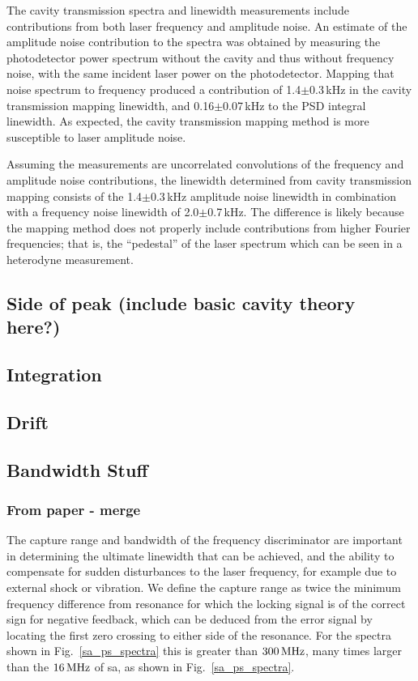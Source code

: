The cavity transmission spectra and linewidth measurements include contributions from both laser frequency and amplitude noise.
An estimate of the amplitude noise contribution to the spectra was obtained by measuring the photodetector power spectrum without the cavity and thus without frequency noise, with the same incident laser power on the photodetector.
Mapping that noise spectrum to frequency produced a contribution of 1.4$\pm$0.3\,kHz in the cavity transmission mapping linewidth,  and 0.16$\pm$0.07\,kHz to the PSD integral linewidth.
As expected, the cavity transmission mapping method is more susceptible to laser amplitude noise. 

Assuming the measurements are uncorrelated convolutions of the frequency and amplitude noise contributions, the linewidth determined from cavity transmission mapping consists of the 1.4$\pm$0.3\,kHz amplitude noise linewidth in combination with a frequency noise linewidth of 2.0$\pm$0.7\,kHz.
The difference is likely because the mapping method does not properly include contributions from higher Fourier frequencies; that is, the ``pedestal'' of the laser spectrum which can be seen in a heterodyne measurement.

\subsection{Side of peak (include basic cavity theory here?)}
\subsection{Integration}
\subsection{Drift}
\subsection{Bandwidth Stuff}
\subsubsection{From paper - merge}
\label{bandwidth_section}
The capture range and bandwidth of the frequency discriminator are important in determining the ultimate linewidth that can be achieved, and the ability to compensate for sudden disturbances to the laser frequency, for example due to external shock or vibration.
We define the capture range as twice the minimum frequency difference from resonance for which the locking signal is of the correct sign for negative feedback, which can be deduced from the error signal by locating the first zero crossing to either side of the resonance.
For the spectra shown in Fig.~\ref{sa_ps_spectra} this is greater than $300\rm\,MHz$, many times larger than the $16\rm\,MHz$ of \gls*{sa}, as shown in Fig.~\ref{sa_ps_spectra}.

